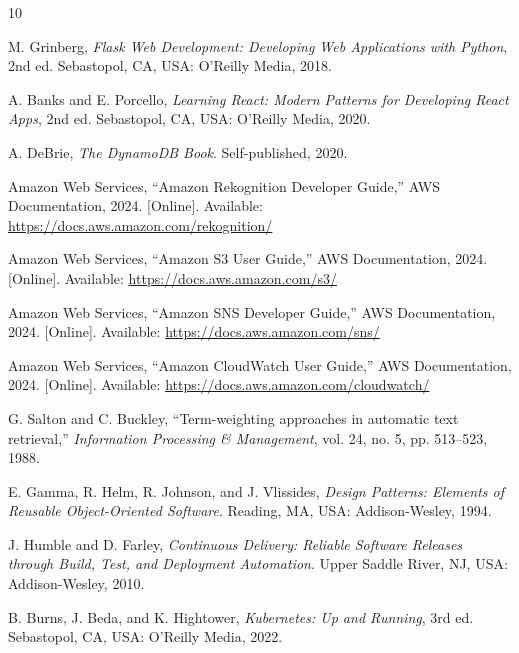 \documentclass[conference]{IEEEtran}
\begin{document}
\begin{thebibliography}{10}

M. Grinberg, \textit{Flask Web Development: Developing Web Applications with Python}, 2nd ed. Sebastopol, CA, USA: O'Reilly Media, 2018.

A. Banks and E. Porcello, \textit{Learning React: Modern Patterns for Developing React Apps}, 2nd ed. Sebastopol, CA, USA: O'Reilly Media, 2020.

A. DeBrie, \textit{The DynamoDB Book}. Self-published, 2020.

Amazon Web Services, ``Amazon Rekognition Developer Guide,'' AWS Documentation, 2024. [Online]. Available: \url{https://docs.aws.amazon.com/rekognition/}

Amazon Web Services, ``Amazon S3 User Guide,'' AWS Documentation, 2024. [Online]. Available: \url{https://docs.aws.amazon.com/s3/}

Amazon Web Services, ``Amazon SNS Developer Guide,'' AWS Documentation, 2024. [Online]. Available: \url{https://docs.aws.amazon.com/sns/}

Amazon Web Services, ``Amazon CloudWatch User Guide,'' AWS Documentation, 2024. [Online]. Available: \url{https://docs.aws.amazon.com/cloudwatch/}

G. Salton and C. Buckley, ``Term-weighting approaches in automatic text retrieval,'' \textit{Information Processing \& Management}, vol. 24, no. 5, pp. 513--523, 1988.

E. Gamma, R. Helm, R. Johnson, and J. Vlissides, \textit{Design Patterns: Elements of Reusable Object-Oriented Software}. Reading, MA, USA: Addison-Wesley, 1994.

J. Humble and D. Farley, \textit{Continuous Delivery: Reliable Software Releases through Build, Test, and Deployment Automation}. Upper Saddle River, NJ, USA: Addison-Wesley, 2010.

B. Burns, J. Beda, and K. Hightower, \textit{Kubernetes: Up and Running}, 3rd ed. Sebastopol, CA, USA: O'Reilly Media, 2022.

\end{thebibliography}
\end{document}
